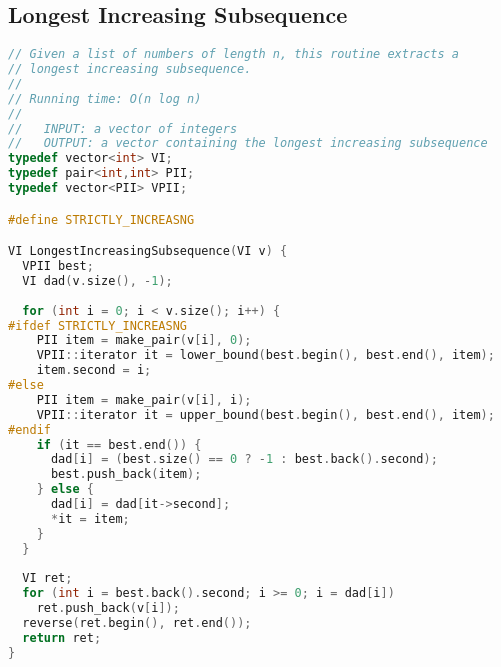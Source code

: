 \subsection{Longest Increasing Subsequence}
\begin{lstlisting}[language=C++]
// Given a list of numbers of length n, this routine extracts a 
// longest increasing subsequence.
//
// Running time: O(n log n)
//
//   INPUT: a vector of integers
//   OUTPUT: a vector containing the longest increasing subsequence
typedef vector<int> VI;
typedef pair<int,int> PII;
typedef vector<PII> VPII;

#define STRICTLY_INCREASNG

VI LongestIncreasingSubsequence(VI v) {
  VPII best;
  VI dad(v.size(), -1);
  
  for (int i = 0; i < v.size(); i++) {
#ifdef STRICTLY_INCREASNG
    PII item = make_pair(v[i], 0);
    VPII::iterator it = lower_bound(best.begin(), best.end(), item);
    item.second = i;
#else
    PII item = make_pair(v[i], i);
    VPII::iterator it = upper_bound(best.begin(), best.end(), item);
#endif
    if (it == best.end()) {
      dad[i] = (best.size() == 0 ? -1 : best.back().second);
      best.push_back(item);
    } else {
      dad[i] = dad[it->second];
      *it = item;
    }
  }
  
  VI ret;
  for (int i = best.back().second; i >= 0; i = dad[i])
    ret.push_back(v[i]);
  reverse(ret.begin(), ret.end());
  return ret;
}
\end{lstlisting}